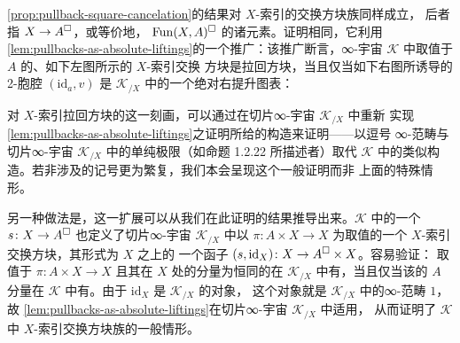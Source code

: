 \begin{remark}\label{rem:x-indexed-pullback-squares}
\cref{prop:pullback-square-cancelation}的结果对 $X$-索引的交换方块族同样成立，
后者指\trDiagram{} $X\to A^{\square}$，或等价地，
$\mathrm{Fun}(X,A)^{\square}$ 的诸元素。证明相同，它利用%
\cref{lem:pullbacks-as-absolute-liftings}的一个推广：该推广断言，∞-宇宙
$\mathcal{K}$ 中取值于\trInfinityCategory{} $A$ 的、如下左图所示的 $X$-索引交换
方块是拉回方块，当且仅当如下右图所诱导的 2-胞腔 $(\mathrm{id}_{a},v)$ 是
$\mathcal{K}_{/X}$ 中的一个绝对右提升图表：
\begin{center}
\qquad
{}
\end{center}
\end{remark}

对 $X$-索引拉回方块的这一刻画，可以通过在切片∞-宇宙 $\mathcal{K}_{/X}$ 中重新
实现\cref{lem:pullbacks-as-absolute-liftings}之证明所给的构造来证明——以逗号
∞-范畴与切片∞-宇宙 $\mathcal{K}_{/X}$ 中的单纯极限（如命题 1.2.22 所描述者）取代
$\mathcal{K}$ 中的类似构造。若非涉及的记号更为繁复，我们本会呈现这个一般证明而非
上面的特殊情形。

另一种做法是，这一扩展可以从我们在此证明的结果推导出来。$\mathcal{K}$ 中的一个%
\trDiagram{} $s\colon X\to A^{\square}$ 也定义了切片∞-宇宙 $\mathcal{K}_{/X}$
中以 $\pi\colon A\times X\to X$ 为取值的一个 $X$-索引交换方块，其形式为 $X$ 之上的
一个函子 $(s,\mathrm{id}_{X})\colon X\to A^{\square}\times X$。容易验证：
取值于 $\pi\colon A\times X\to X$ 且其在 $X$ 处的分量为恒同的\trDiagram{}在
$\mathcal{K}_{/X}$ 中有\trLimit{}，当且仅当该\trDiagram{}的 $A$ 分量在 $\mathcal{K}$
中有\trLimit{}。由于 $\mathrm{id}_{X}$ 是 $\mathcal{K}_{/X}$ 的\trTerminal{}对象，
这个对象就是 $\mathcal{K}_{/X}$ 中的∞-范畴 $1$，故%
\cref{lem:pullbacks-as-absolute-liftings}在切片∞-宇宙 $\mathcal{K}_{/X}$ 中适用，
从而证明了 $\mathcal{K}$ 中 $X$-索引交换方块族的一般情形。

